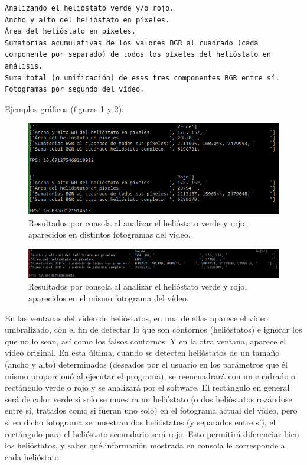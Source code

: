 \begin{lstlisting}
Analizando el helióstato verde y/o rojo.
Ancho y alto del helióstato en píxeles.
Área del helióstato en píxeles.
Sumatorias acumulativas de los valores BGR al cuadrado (cada componente por separado) de todos los píxeles del helióstato en análisis.
Suma total (o unificación) de esas tres componentes BGR entre sí.
Fotogramas por segundo del vídeo.
\end{lstlisting}

Ejemplos gráficos (figuras \ref{fig:CapturasEntradasYSalidas/Captura(2).PNG} y \ref{fig:CapturasEntradasYSalidas/Captura(3).PNG}):

\begin{figure}[h!]
  	\centering
	\includegraphics[width=\textwidth]{CapturasEntradasYSalidas/Captura(2).PNG}
	\caption{Resultados por consola al analizar el helióstato verde y rojo, aparecidos en distintos fotogramas del vídeo.
	\label{fig:CapturasEntradasYSalidas/Captura(2).PNG}}
\end{figure}

\begin{figure}[h!]
  	\centering
	\includegraphics[width=\textwidth]{CapturasEntradasYSalidas/Captura(3).PNG}
	\caption{Resultados por consola al analizar el helióstato verde y rojo, aparecidos en el mismo fotograma del vídeo.
	\label{fig:CapturasEntradasYSalidas/Captura(3).PNG}}
\end{figure}

En las ventanas del vídeo de helióstatos, en una de ellas aparece el vídeo umbralizado, con el fin de detectar lo que son contornos (helióstatos) e ignorar los que no lo sean, así como los falsos contornos. Y en la otra ventana, aparece el vídeo original. En esta última, cuando se detecten helióstatos de un tamaño (ancho y alto) determinados (deseados por el usuario en los parámetros que él mismo proporcionó al ejecutar el programa), se reencuadrará con un cuadrado o rectángulo verde o rojo y se analizará por el software. El rectángulo en general será de color verde si solo se muestra un helióstato (o dos helióstatos rozándose entre sí, tratados como si fueran uno solo) en el fotograma actual del vídeo, pero si en dicho fotograma se muestran dos helióstatos (y separados entre sí), el rectángulo para el helióstato secundario será rojo. Esto permitirá diferenciar bien los helióstatos, y saber qué información mostrada en consola le corresponde a cada helióstato.

